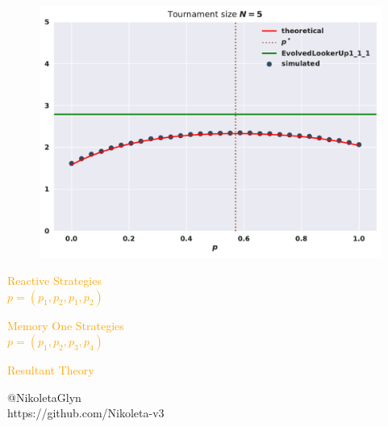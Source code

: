 \documentclass{beamer}
\begin{document}
\begin{frame}
\begin{figure}
        \centering
        \includegraphics[width=0.8\linewidth]{static/optimisation}
\end{figure}
\end{frame}

\begin{frame}
    \centering
    \Large
    \textcolor{orange}{Reactive Strategies} \\
    \textcolor{orange}{$p=(p_1, p_2, p_1, p_2)$}
\end{frame}

\begin{frame}
        \centering
        \Large
    \textcolor{orange}{Memory One Strategies} \\
    \textcolor{orange}{$p=(p_1, p_2, p_3, p_4)$}  
\end{frame}

\begin{frame}
    \centering
    \huge 
    \textcolor{orange}{Resultant Theory}    
\end{frame}

\begin{frame}
\centering

\end{frame}

\begin{frame}
    \centering
    \small{@NikoletaGlyn}\\
    \small{https://github.com/Nikoleta-v3}\\
\end{frame}
\end{document}
